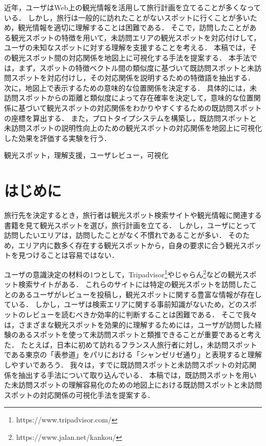 \documentclass{deimj}
\begin{document}
\pagestyle{empty}
\begin{jabstract}
近年，ユーザはWeb上の観光情報を活用して旅行計画を立てることが多くなっている．
しかし，旅行は一般的に訪れたことがないスポットに行くことが多いため，観光情報を適切に理解することは困難である．
そこで，訪問したことがある観光スポットの特徴を用いて，未訪問エリアの観光スポットを対応付けして，ユーザの未知なスポットに対する理解を支援することを考える．
本稿では，その観光スポット間の対応関係を地図上に可視化する手法を提案する．
本手法では，まず，スポットの特徴ベクトル間の類似度に基づいて既訪問スポットと未訪問スポットを対応付けし，その対応関係を説明するための特徴語を抽出する．
次に，地図上で表示するための意味的な位置関係を決定する．
具体的には，未訪問スポットからの距離と類似度によって存在確率を決定して，意味的な位置関係に基づいて観光スポットの対応関係をわかりやすくするための既訪問スポットの座標を算出する．
また，プロトタイプシステムを構築し，既訪問スポットと未訪問スポットの説明性向上のための観光スポットの対応関係を地図上に可視化した効果を評価する実験を行う．
\end{jabstract}

\begin{jkeyword}
観光スポット，理解支援，ユーザレビュー，可視化
\end{jkeyword}
\maketitle

\section{はじめに}

旅行先を決定するとき，旅行者は観光スポット検索サイトや観光情報に関連する書籍を見て観光スポットを選び，旅行計画を立てる．
しかし，ユーザにとって訪問したいエリアは，訪問したことがなく不慣れであることが多い．
そのため，エリア内に数多く存在する観光スポットから，自身の要求に合う観光スポットを見つけることは容易ではない．

ユーザの意識決定の材料の1つとして，Tripadvisor\footnote{https://www.tripadvisor.com/}やじゃらん\footnote{https://www.jalan.net/kankou/}などの観光スポット検索サイトがある．
これらのサイトには特定の観光スポットを訪問したことのあるユーザがレビューを投稿し，観光スポットに関する豊富な情報が存在している．
しかし，ユーザは検索エリアに関する事前知識がないため，どのスポットのレビューを読むべきか効率的に判断することは困難である．
そこで我々は，さまざまな観光スポットを効果的に理解するためには，ユーザが訪問した経験のあるスポットを使って未訪問スポットと類推できることが重要であると考えた．
たとえば，日本に初めて訪れるフランス人旅行者に対し，未訪問スポットである東京の「表参道」をパリにおける「シャンゼリゼ通り」と表現すると理解しやすいであろう．
我々は，すでに既訪問スポットと未訪問スポットの対応関係を抽出する手法について取り込んでいる\cite{潘}．
本稿では，既訪問スポットを用いた未訪問スポットの理解容易化のための地図上における既訪問スポットと未訪問スポットの対応関係の可視化手法を提案する．
\end{document}
